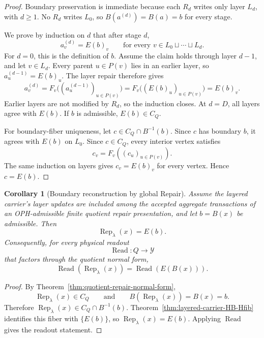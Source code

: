 \documentclass[11pt]{article}
\newtheorem{corollary}[theorem]{Corollary}
\theoremstyle{remark}
\theoremstyle{plain}
\begin{document}
\begin{proof}
Boundary preservation is immediate because each \(R_d\) writes only layer \(L_d\), with \(d\ge1\).
No \(R_d\) writes \(L_0\), so \(B(a^{(d)})=B(a)=b\) for every stage.

We prove by induction on \(d\) that after stage \(d\),
\[
a^{(d)}_v=E(b)_v
\qquad
\text{for every }v\in L_0\sqcup\cdots\sqcup L_d.
\]
For \(d=0\), this is the definition of \(b\).  Assume the claim holds through layer \(d-1\), and
let \(v\in L_d\).  Every parent \(u\in P(v)\) lies in an earlier layer, so
\(a^{(d-1)}_u=E(b)_u\).  The layer repair therefore gives
\[
a^{(d)}_v
=
F_v\bigl((a^{(d-1)}_u)_{u\in P(v)}\bigr)
=
F_v\bigl((E(b)_u)_{u\in P(v)}\bigr)
=
E(b)_v.
\]
Earlier layers are not modified by \(R_d\), so the induction closes.  At \(d=D\), all layers agree
with \(E(b)\).  If \(b\) is admissible, \(E(b)\in C_Q\).

For boundary-fiber uniqueness, let \(c\in C_Q\cap B^{-1}(b)\).  Since \(c\) has boundary \(b\), it
agrees with \(E(b)\) on \(L_0\).  Since \(c\in C_Q\), every interior vertex satisfies
\[
c_v=F_v((c_u)_{u\in P(v)}).
\]
The same induction on layers gives \(c_v=E(b)_v\) for every vertex.  Hence \(c=E(b)\).
\end{proof}

\begin{corollary}[Boundary reconstruction by global Repair]\label{cor:layered-carrier-reconstruction}
Assume the layered carrier's layer updates are included among the accepted aggregate transactions
of an OPH-admissible finite quotient repair presentation, and let \(b=B(x)\) be admissible.  Then
\[
\operatorname{Rep}_\lambda(x)=E(b).
\]
Consequently, for every physical readout
\[
\operatorname{Read}:Q\to\mathcal Y
\]
that factors through the quotient normal form,
\[
\operatorname{Read}(\operatorname{Rep}_\lambda(x))
=
\operatorname{Read}(E(B(x))).
\]
\end{corollary}

\begin{proof}
By Theorem~\ref{thm:quotient-repair-normal-form},
\[
\operatorname{Rep}_\lambda(x)\in C_Q
\qquad\text{and}\qquad
B(\operatorname{Rep}_\lambda(x))=B(x)=b.
\]
Therefore \(\operatorname{Rep}_\lambda(x)\in C_Q\cap B^{-1}(b)\).  Theorem~\ref{thm:layered-carrier-HB-Hfib}
identifies this fiber with \(\{E(b)\}\), so \(\operatorname{Rep}_\lambda(x)=E(b)\).  Applying
\(\operatorname{Read}\) gives the readout statement.
\end{proof}
\end{document}
